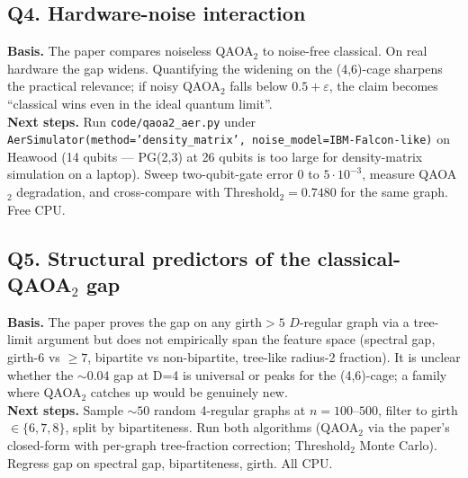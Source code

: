 \subsection*{Q4. Hardware-noise interaction}
\textbf{Basis.} The paper compares noiseless QAOA$_2$ to noise-free classical. On real hardware the gap widens. Quantifying the widening on the (4,6)-cage sharpens the practical relevance; if noisy QAOA$_2$ falls below $0.5+\varepsilon$, the claim becomes ``classical wins even in the ideal quantum limit''.\\
\textbf{Next steps.} Run \texttt{code/qaoa2\_aer.py} under \texttt{AerSimulator(method='density\_matrix', noise\_model=IBM-Falcon-like)} on Heawood (14 qubits --- PG(2,3) at 26 qubits is too large for density-matrix simulation on a laptop). Sweep two-qubit-gate error $0$ to $5\!\cdot\!10^{-3}$, measure QAOA$_2$ degradation, and cross-compare with Threshold$_2 = 0.7480$ for the same graph. Free CPU.

\subsection*{Q5. Structural predictors of the classical-QAOA$_2$ gap}
\textbf{Basis.} The paper proves the gap on any girth$>5$ $D$-regular graph via a tree-limit argument but does not empirically span the feature space (spectral gap, girth-6 vs $\ge 7$, bipartite vs non-bipartite, tree-like radius-2 fraction). It is unclear whether the $\sim 0.04$ gap at D=4 is universal or peaks for the (4,6)-cage; a family where QAOA$_2$ catches up would be genuinely new.\\
\textbf{Next steps.} Sample $\sim 50$ random 4-regular graphs at $n{=}100$--$500$, filter to girth $\in\{6,7,8\}$, split by bipartiteness. Run both algorithms (QAOA$_2$ via the paper's closed-form with per-graph tree-fraction correction; Threshold$_2$ Monte Carlo). Regress gap on spectral gap, bipartiteness, girth. All CPU.
